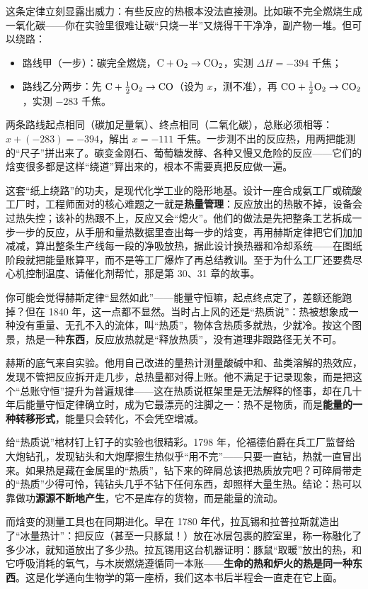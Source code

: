 这条定律立刻显露出威力：有些反应的热根本没法直接测。比如碳不完全燃烧生成一氧化碳——你在实验里很难让碳“只烧一半”又烧得干干净净，副产物一堆。但可以绕路：

\begin{itemize}[itemsep=2pt]
\item 路线甲（一步）：碳完全燃烧，$\mathrm{C} + \mathrm{O_2} \rightarrow \mathrm{CO_2}$，实测 $\Delta H=-394$ 千焦；
\item 路线乙分两步：先 $\mathrm{C} + \frac{1}{2}\mathrm{O_2} \rightarrow \mathrm{CO}$（设为 $x$，测不准），再 $\mathrm{CO} + \frac{1}{2}\mathrm{O_2} \rightarrow \mathrm{CO_2}$，实测 $-283$ 千焦。
\end{itemize}

两条路线起点相同（碳加足量氧）、终点相同（二氧化碳），总账必须相等：$x+(-283)=-394$，解出 $x=-111$ 千焦。一步测不出的反应热，用两把能测的“尺子”拼出来了。碳变金刚石、葡萄糖发酵、各种又慢又危险的反应——它们的焓变很多都是这样“绕道”算出来的，根本不需要真把反应做一遍。

这套“纸上绕路”的功夫，是现代化学工业的隐形地基。设计一座合成氨工厂或硫酸工厂时，工程师面对的核心难题之一就是\textbf{热量管理}：反应放出的热散不掉，设备会过热失控；该补的热跟不上，反应又会“熄火”。他们的做法是先把整条工艺拆成一步一步的反应，从手册和量热数据里查出每一步的焓变，再用赫斯定律把它们加加减减，算出整条生产线每一段的净吸放热，据此设计换热器和冷却系统——在图纸阶段就把能量账算平，而不是等工厂爆炸了再总结教训。至于为什么工厂还要费尽心机控制温度、请催化剂帮忙，那是第 30、31 章的故事。

\begin{zhengju}
你可能会觉得赫斯定律“显然如此”——能量守恒嘛，起点终点定了，差额还能跑掉？但在 1840 年，这一点都不显然。当时占上风的还是“热质说”：热被想象成一种没有重量、无孔不入的流体，叫“热质”，物体含热质多就热，少就冷。按这个图景，热是一种\textbf{东西}，反应放热就是“释放热质”，没有道理非跟路径无关不可。

赫斯的底气来自实验。他用自己改进的量热计测量酸碱中和、盐类溶解的热效应，发现不管把反应拆开走几步，总热量都对得上账。他不满足于记录现象，而是把这个“总账守恒”提升为普遍规律——这在热质说框架里是无法解释的怪事，却在几十年后能量守恒定律确立时，成为它最漂亮的注脚之一：热不是物质，而是\textbf{能量的一种转移形式}，能量只会转化，不会凭空增减。

给“热质说”棺材钉上钉子的实验也很精彩。1798 年，伦福德伯爵在兵工厂监督给大炮钻孔，发现钻头和大炮摩擦生热似乎“用不完”——只要一直钻，热就一直冒出来。如果热是藏在金属里的“热质”，钻下来的碎屑总该把热质放完吧？可碎屑带走的“热质”少得可怜，钝钻头几乎不钻下任何东西，却照样大量生热。结论：热可以靠做功\textbf{源源不断地产生}，它不是库存的货物，而是能量的流动。

而焓变的测量工具也在同期进化。早在 1780 年代，拉瓦锡和拉普拉斯就造出了“冰量热计”：把反应（甚至一只豚鼠！）放在冰层包裹的腔室里，称一称融化了多少冰，就知道放出了多少热。拉瓦锡用这台机器证明：豚鼠“取暖”放出的热，和它呼吸消耗的氧气，与木炭燃烧遵循同一本账——\textbf{生命的热和炉火的热是同一种东西}。这是化学通向生物学的第一座桥，我们这本书后半程会一直走在它上面。
\end{zhengju}
